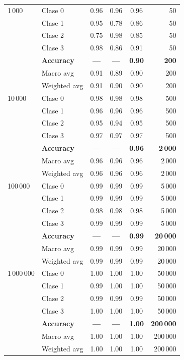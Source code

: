 \documentclass[12pt,a4paper]{article}
\begin{document}
\begin{enumerate}
\begin{longtable}{@{}l l c c c r@{}}
    1\,000 & Clase 0      & 0.96 & 0.96 & 0.96 & 50 \\
          & Clase 1       & 0.95 & 0.78 & 0.86 & 50 \\
          & Clase 2       & 0.75 & 0.98 & 0.85 & 50 \\
          & Clase 3       & 0.98 & 0.86 & 0.91 & 50 \\
          & \textbf{Accuracy}    & \textbf{—}   & \textbf{—}   & \textbf{0.90} & \textbf{200} \\
          & Macro avg     & 0.91 & 0.89 & 0.90 & 200 \\
          & Weighted avg  & 0.91 & 0.90 & 0.90 & 200 \\
    \addlinespace

    10\,000 & Clase 0     & 0.98 & 0.98 & 0.98 & 500 \\
          & Clase 1      & 0.96 & 0.96 & 0.96 & 500 \\
          & Clase 2      & 0.95 & 0.94 & 0.95 & 500 \\
          & Clase 3      & 0.97 & 0.97 & 0.97 & 500 \\
          & \textbf{Accuracy}   & \textbf{—}   & \textbf{—}   & \textbf{0.96} & \textbf{2\,000} \\
          & Macro avg    & 0.96 & 0.96 & 0.96 & 2\,000 \\
          & Weighted avg & 0.96 & 0.96 & 0.96 & 2\,000 \\
    \addlinespace

    100\,000 & Clase 0    & 0.99 & 0.99 & 0.99 & 5\,000 \\
            & Clase 1     & 0.99 & 0.99 & 0.99 & 5\,000 \\
            & Clase 2     & 0.98 & 0.98 & 0.98 & 5\,000 \\
            & Clase 3     & 0.99 & 0.99 & 0.99 & 5\,000 \\
            & \textbf{Accuracy}   & \textbf{—}   & \textbf{—}   & \textbf{0.99} & \textbf{20\,000} \\
            & Macro avg    & 0.99 & 0.99 & 0.99 & 20\,000 \\
            & Weighted avg & 0.99 & 0.99 & 0.99 & 20\,000 \\
    \addlinespace

    1\,000\,000 & Clase 0  & 1.00 & 1.00 & 1.00 & 50\,000 \\
              & Clase 1   & 0.99 & 1.00 & 1.00 & 50\,000 \\
              & Clase 2   & 0.99 & 0.99 & 0.99 & 50\,000 \\
              & Clase 3   & 1.00 & 1.00 & 1.00 & 50\,000 \\
              & \textbf{Accuracy} & \textbf{—} & \textbf{—} & \textbf{1.00} & \textbf{200\,000} \\
              & Macro avg    & 1.00 & 1.00 & 1.00 & 200\,000 \\
              & Weighted avg & 1.00 & 1.00 & 1.00 & 200\,000 \\
  \end{longtable}


\end{enumerate}
\end{document}
